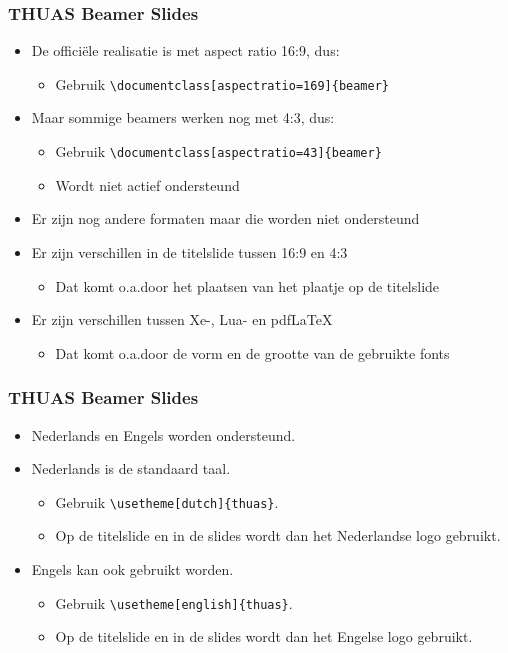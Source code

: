 \documentclass[fleqn,aspectratio=169,dutch,10pt]{beamer}
\begin{document}
\begin{frame}[fragile]
\frametitle{THUAS Beamer Slides}
\begin{itemize}
\item De officiële realisatie is met aspect ratio 16:9, dus:
\begin{itemize}
\item Gebruik \lstinline|\documentclass[aspectratio=169]{beamer}|
\end{itemize}
\item Maar sommige beamers werken nog met 4:3, dus:
\begin{itemize}
\item Gebruik \lstinline|\documentclass[aspectratio=43]{beamer}|
\item Wordt niet actief ondersteund
\end{itemize}
\item Er zijn nog andere formaten maar die worden niet ondersteund
\item Er zijn verschillen in de titelslide tussen 16:9 en 4:3
\begin{itemize}
\item Dat komt o.a.\@ door het plaatsen van het plaatje op de titelslide
\end{itemize}
\item Er zijn verschillen tussen Xe-, Lua- en pdf\LaTeX
\begin{itemize}
\item Dat komt o.a.\@ door de vorm en de grootte van de gebruikte fonts
\end{itemize}
\end{itemize}
\end{frame}


\begin{frame}[fragile]
\frametitle{THUAS Beamer Slides}
\begin{itemize}
\item Nederlands en Engels worden ondersteund.
\item Nederlands is de standaard taal.
\begin{itemize}
\item Gebruik \lstinline|\usetheme[dutch]{thuas}|.
\item Op de titelslide en in de slides wordt dan het Nederlandse logo gebruikt.
\end{itemize}
\item Engels kan ook gebruikt worden.
\begin{itemize}
\item Gebruik \lstinline|\usetheme[english]{thuas}|.
\item Op de titelslide en in de slides wordt dan het Engelse logo gebruikt.
\end{itemize}
\end{itemize}
\end{frame}
\end{document}
